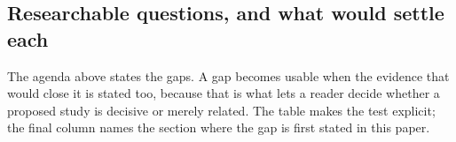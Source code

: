 
\subsection{Researchable questions, and what would settle each}\label{sec:research_questions}

The agenda above states the gaps. A gap becomes usable when the evidence that would close it is
stated too, because that is what lets a reader decide whether a proposed study is decisive or merely
related. The table makes the test explicit; the final column names the section where the gap is first
stated in this paper.


